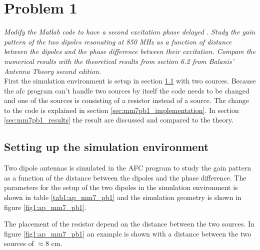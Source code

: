 \section{Problem 1}
\textit{ Modify the Matlab code to have a second excitation phase delayed . Study the gain pattern of the two dipoles resonating at 850 MHz as a function of distance between the dipoles and the phase difference between their excitation. Compare the numerical results with the theoretical results from section 6.2 from Balanis’ Antenna Theory second edition.}\\

First the simulation environment is setup in section \ref{sec:mm7pb1_simulation} with two sources. Because the afc program can't handle two sources by itself the code needs to be changed and one of the sources is consisting of a resistor instead of a source. The change to the code is explained in section \ref{sec:mm7pb1_implementation}. In section \ref{sec:mm7pb1_results} the result are discussed and compared to the theory. 


\subsection{Setting up the simulation environment}\label{sec:mm7pb1_simulation}
Two dipole antennas is simulated in the AFC program to study the gain pattern as a function of the distance between the dipoles and the phase difference. The parameters for the setup of the two dipoles in the simulation environment is shown in table \ref{tab1:ap_mm7_pb1} and the simulation geometry is shown in figure \ref{fig1:ap_mm7_pb1}. 


The placement of the resistor depend on the distance between the two sources. In figure \ref{fig1:ap_mm7_pb1} an example is shown with a distance between the two sources of $\approx$8 cm. 

